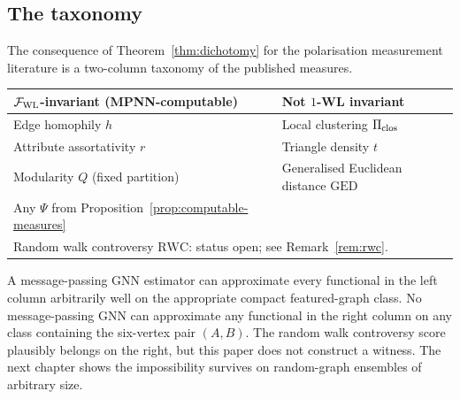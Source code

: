 \subsection{The taxonomy}

The consequence of Theorem~\ref{thm:dichotomy} for the polarisation
measurement literature is a two-column taxonomy of the published
measures.

\begin{center}
\begin{tabular}{ll}
\hline
$\mathcal{F}_{\mathrm{WL}}$-invariant (MPNN-computable) & Not $1$-WL invariant \\
\hline
Edge homophily $h$ & Local clustering $\Pi_{\mathrm{clos}}$ \\
Attribute assortativity $r$ & Triangle density $t$ \\
Modularity $Q$ (fixed partition) & Generalised Euclidean distance $\mathrm{GED}$ \\
Any $\Psi$ from Proposition~\ref{prop:computable-measures} & \\
\hline
\multicolumn{2}{l}{Random walk controversy $\mathrm{RWC}$: status
open; see Remark~\ref{rem:rwc}.} \\
\hline
\end{tabular}
\end{center}

A message-passing GNN estimator can approximate every functional in
the left column arbitrarily well on the appropriate compact
featured-graph class. No message-passing GNN can approximate any
functional in the right column on any class containing the six-vertex
pair $(A, B)$. The random walk controversy score plausibly belongs on
the right, but this paper does not construct a witness. The next
chapter shows the impossibility survives on random-graph ensembles
of arbitrary size.
